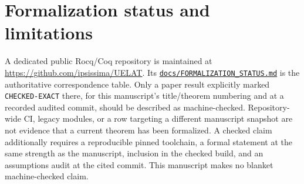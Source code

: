 \documentclass[11pt]{article}
\theoremstyle{definition}
\begin{document}
\section{Formalization status and limitations}\label{sec:formal}

A dedicated public Rocq/Coq repository is maintained at \url{https://github.com/ipsissima/UELAT}.
Its \href{https://github.com/ipsissima/UELAT/blob/main/docs/FORMALIZATION_STATUS.md}{\texttt{docs/FORMALIZATION\_STATUS.md}}
is the authoritative correspondence table.  Only a paper result explicitly marked
\texttt{CHECKED-EXACT} there, for this manuscript's title/theorem numbering and at a
recorded audited commit, should be described as machine-checked.  Repository-wide CI,
legacy modules, or a row targeting a different manuscript snapshot are not evidence that a
current theorem has been formalized.  A checked claim additionally requires a reproducible
pinned toolchain, a formal statement at the same strength as the manuscript, inclusion in
the checked build, and an assumptions audit at the cited commit.  This manuscript makes no
blanket machine-checked claim.
\end{document}
